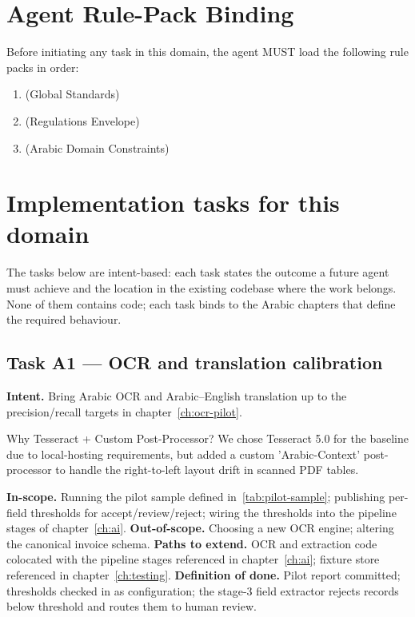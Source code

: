 \documentclass[11pt,a4paper,twoside]{report}
\begin{document}
\section{Agent Rule-Pack Binding}
\label{sec:agent-rule-binding}
Before initiating any task in this domain, the agent MUST load the following rule packs in order:
\begin{enumerate}
\item {} (Global Standards)
\item {} (Regulations Envelope)
\item {} (Arabic Domain Constraints)
\end{enumerate}

\section{Implementation tasks for this domain}
\label{sec:agent-tasks}
The tasks below are intent-based: each task states the outcome a
future agent must achieve and the location in the existing codebase
where the work belongs. None of them contains code; each task binds
to the Arabic chapters that define the required behaviour.

\subsection*{Task A1 --- OCR and translation calibration}
\textbf{Intent.} Bring Arabic OCR and Arabic--English translation up
to the precision/recall targets in chapter~\ref{ch:ocr-pilot}.

\begin{adrbox}{Why Tesseract + Custom Post-Processor?}
We chose Tesseract 5.0 for the baseline due to local-hosting requirements, but added a custom 'Arabic-Context' post-processor to handle the right-to-left layout drift in scanned PDF tables.
\end{adrbox}

\textbf{In-scope.} Running the pilot sample defined
in~\ref{tab:pilot-sample}; publishing per-field thresholds for
accept/review/reject; wiring the thresholds into the pipeline stages
of chapter~\ref{ch:ai}.
\textbf{Out-of-scope.} Choosing a new OCR engine; altering the
canonical invoice schema.
\textbf{Paths to extend.} OCR and extraction code colocated with the
pipeline stages referenced in chapter~\ref{ch:ai}; fixture store
referenced in chapter~\ref{ch:testing}.
\textbf{Definition of done.} Pilot report committed; thresholds
checked in as configuration; the stage-3 field extractor rejects
records below threshold and routes them to human review.
\end{document}
